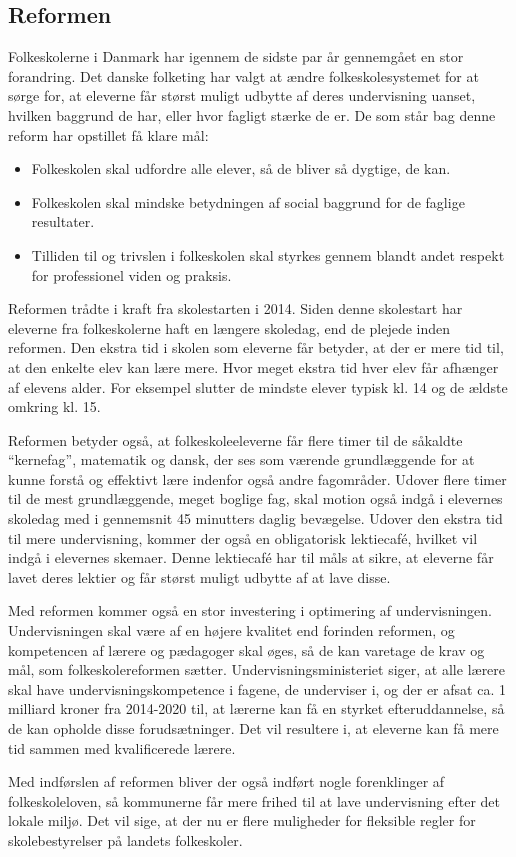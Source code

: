 \subsection{Reformen}
\label{Reformen}
Folkeskolerne i Danmark har igennem de sidste par år gennemgået en stor forandring. Det danske folketing har valgt at ændre folkeskolesystemet for at sørge for, at eleverne får størst muligt udbytte af deres undervisning uanset, hvilken baggrund de har, eller hvor fagligt stærke de er.
De som står bag denne reform har opstillet få klare mål\cite{reformenMaal}:
	\begin{itemize}
		\item Folkeskolen skal udfordre alle elever, så de bliver så dygtige, de kan.
		\item Folkeskolen skal mindske betydningen af social baggrund for de faglige resultater.
		\item Tilliden til og trivslen i folkeskolen skal styrkes gennem blandt andet respekt for professionel viden og praksis.
	\end{itemize}

Reformen trådte i kraft fra skolestarten i 2014. Siden denne skolestart har eleverne fra folkeskolerne haft en længere skoledag, end de plejede inden reformen. Den ekstra tid i skolen som eleverne får betyder, at der er mere tid til, at den enkelte elev kan lære mere. Hvor meget ekstra tid hver elev får afhænger af elevens alder. For eksempel slutter de mindste elever typisk kl. 14 og de ældste omkring kl. 15.

Reformen betyder også, at folkeskoleeleverne får flere timer til de såkaldte ``kernefag'', matematik og dansk, der ses som værende grundlæggende for at kunne forstå og effektivt lære indenfor også andre fagområder. Udover flere timer til de mest grundlæggende, meget boglige fag, skal motion også indgå i elevernes skoledag med i gennemsnit 45 minutters daglig bevægelse\cite{reformenBorger}. Udover den ekstra tid til mere undervisning, kommer der også en obligatorisk lektiecafé, hvilket vil indgå i elevernes skemaer. Denne lektiecafé har til måls at sikre, at eleverne får lavet deres lektier og får størst muligt udbytte af at lave disse.

Med reformen kommer også en stor investering i optimering af undervisningen. Undervisningen skal være af en højere kvalitet end forinden reformen, og kompetencen af lærere og pædagoger skal øges, så de kan varetage de krav og mål, som folkeskolereformen sætter. Undervisningsministeriet siger, at alle lærere skal have undervisningskompetence i fagene, de underviser i, og der er afsat ca. 1 milliard kroner fra 2014-2020 til, at lærerne kan få en styrket efteruddannelse, så de kan opholde disse forudsætninger\cite{reformenMaal}. Det vil resultere i, at eleverne kan få mere tid sammen med kvalificerede lærere.

Med indførslen af reformen bliver der også indført nogle forenklinger af folkeskoleloven, så kommunerne får mere frihed til at lave undervisning efter det lokale miljø. Det vil sige, at der nu er flere muligheder for fleksible regler for skolebestyrelser på landets folkeskoler.
